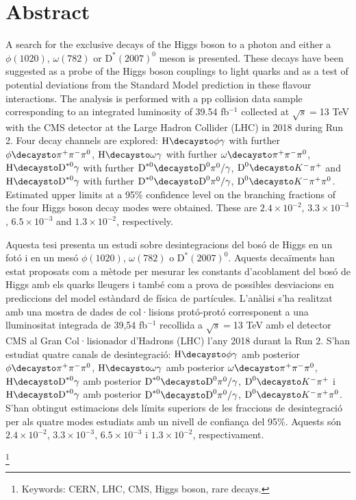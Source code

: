 \thispagestyle{empty}
\makeatletter
\@openrightfalse
\makeatother
\chapter*{Abstract}

\vspace*{-0.2cm}

A search for the exclusive decays of the Higgs boson to a photon and either a $\phi(1020)$, $\omega(782)$ or $\text{D}^{*}(2007)^{0}$ meson is presented. These decays have been suggested as a probe of the Higgs boson couplings to light quarks and as a test of potential deviations from the Standard Model prediction in these flavour interactions. The analysis is performed with a pp collision data sample corresponding to an integrated luminosity of 39.54 fb$^{-1}$ collected at $\sqrt{s}=$13 TeV with the CMS detector at the Large Hadron Collider (LHC) in 2018 during Run 2. Four decay channels are explored: $\text{H}\decaysto \phi\gamma$ with further $\phi\decaysto \pi^+\pi^-\pi^0$, $\text{H}\decaysto \omega\gamma$ with further $\omega\decaysto \pi^+\pi^-\pi^0$, $\text{H}\decaysto \text{D}^{*0}\gamma$ with further $\text{D}^{*0}\decaysto \text{D}^{0}\pi^{0}/\gamma$, $\text{D}^{0}\decaysto K^{-}\pi^{+}$ and $\text{H}\decaysto \text{D}^{*0}\gamma$ with further $\text{D}^{*0}\decaysto \text{D}^{0}\pi^{0}/\gamma$, $\text{D}^{0}\decaysto K^{-}\pi^{+}\pi^{0}$. Estimated upper limits at a 95\% confidence level on the branching fractions of the four Higgs boson decay modes were obtained. These are $2.4 \times 10^{-2}$, $3.3 \times 10^{-3}$, $6.5 \times 10^{-3}$ and $1.3 \times 10^{-2}$, respectively.

\vspace*{1.5cm}

Aquesta tesi presenta un estudi sobre desintegracions del bosó de Higgs en un fotó i en un mesó $\phi(1020)$, $\omega(782)$ o $\text{D}^{*}(2007)^{0}$. Aquests decaïments han estat proposats com a mètode per mesurar les constants d'acoblament del bosó de Higgs amb els quarks lleugers i també com a prova de possibles desviacions en prediccions del model estàndard de física de partícules. L'anàlisi s'ha realitzat amb una mostra de dades de col·lisions protó-protó corresponent a una lluminositat integrada de 39,54 fb$^{-1}$ recollida a $\sqrt{s}=$13 TeV amb el detector CMS al Gran Col·lisionador d'Hadrons (LHC) l'any 2018 durant la Run 2. S'han estudiat quatre canals de desintegració: $\text{H}\decaysto \phi\gamma$ amb posterior $\phi\decaysto \pi^+\pi^-\pi^0$, $\text{H}\decaysto \omega\gamma$ amb posterior $\omega\decaysto \pi^+\pi^-\pi^0$, $\text{H}\decaysto \text{D}^{*0}\gamma$ amb posterior $\text{D}^{*0}\decaysto \text{D}^{0}\pi^{0}/\gamma$, $\text{D}^{0}\decaysto K^{-}\pi^{+}$ i $\text{H}\decaysto \text{D}^{*0}\gamma$ amb posterior $\text{D}^{*0}\decaysto \text{D}^{0}\pi^{0}/\gamma$, $\text{D}^{0}\decaysto K^{-}\pi^{+}\pi^{0}$. S'han obtingut estimacions dels límits superiors de les fraccions de desintegració per als quatre modes estudiats amb un nivell de confiança del 95\%. Aquests són $2.4 \times 10^{-2}$, $3.3 \times 10^{-3}$, $6.5 \times 10^{-3}$ i $1.3 \times 10^{-2}$, respectivament.

\vspace*{-0.2cm}


{\let\thefootnote\relax\footnote{Keywords: CERN, LHC, CMS, Higgs boson, rare decays.}}
